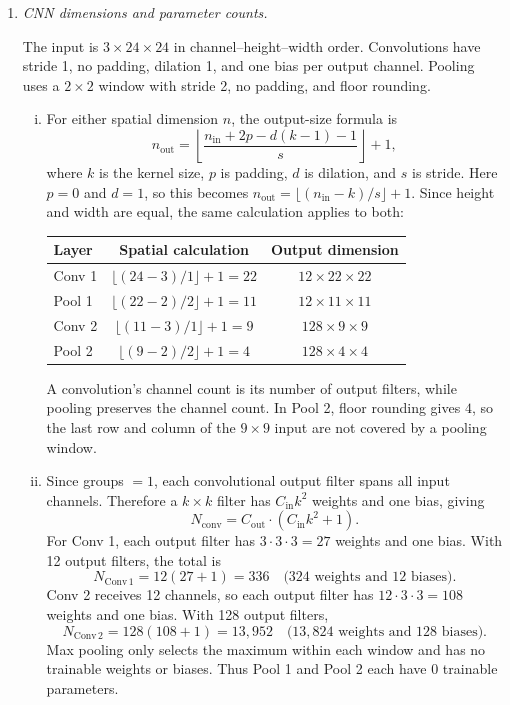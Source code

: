 \documentclass[12pt]{article}
\begin{document}
\begin{enumerate}
\begin{enumerate}[label=\textbf{\Alph*.}, leftmargin=*]
   \item \emph{CNN dimensions and parameter counts.}

   The input is $3\times24\times24$ in channel--height--width order.
   Convolutions have stride 1, no padding, dilation 1, and one bias per
   output channel. Pooling uses a $2\times2$ window with stride 2,
   no padding, and floor rounding.

   \begin{enumerate}[(i)]
    \item For either spatial dimension $n$, the output-size formula is
    \[
        n_{\mathrm{out}}
        =\left\lfloor\frac{n_{\mathrm{in}}+2p-d(k-1)-1}{s}\right\rfloor+1,
    \]
    where $k$ is the kernel size, $p$ is padding, $d$ is dilation,
    and $s$ is stride. Here $p=0$ and $d=1$, so this becomes
    $n_{\mathrm{out}}=\lfloor(n_{\mathrm{in}}-k)/s\rfloor+1$.
    Since height and width are equal, the same calculation applies to both:
    \begin{center}
    \begin{tabular}{l c c}
        \toprule
        Layer & Spatial calculation & Output dimension \\
        \midrule
        Conv 1 & $\lfloor(24-3)/1\rfloor+1=22$ & $12\times22\times22$ \\
        Pool 1 & $\lfloor(22-2)/2\rfloor+1=11$ & $12\times11\times11$ \\
        Conv 2 & $\lfloor(11-3)/1\rfloor+1=9$ & $128\times9\times9$ \\
        Pool 2 & $\lfloor(9-2)/2\rfloor+1=4$ & $128\times4\times4$ \\
        \bottomrule
    \end{tabular}
    \end{center}
    A convolution's channel count is its number of output filters, while
    pooling preserves the channel count. In Pool 2, floor rounding gives
    $4$, so the last row and column of the $9\times9$ input are not covered
    by a pooling window.

    \item Since groups $=1$, each convolutional output filter spans all input channels.
    Therefore a $k\times k$ filter has $C_{\mathrm{in}}k^2$ weights and
    one bias, giving
    \[
        N_{\mathrm{conv}}=C_{\mathrm{out}}\cdot(C_{\mathrm{in}}k^2+1).
    \]
    For Conv 1, each output filter has $3\cdot3\cdot3=27$ weights
    and one bias. With 12 output filters, the total is
    \[
        N_{\mathrm{Conv\,1}}=12(27+1)=\boxed{336}
        \quad\text{($324$ weights and $12$ biases).}
    \]
    Conv 2 receives 12 channels, so each output filter has
    $12\cdot3\cdot3=108$ weights and one bias. With 128 output filters,
    \[
        N_{\mathrm{Conv\,2}}=128(108+1)=\boxed{13{,}952}
        \quad\text{($13{,}824$ weights and $128$ biases).}
    \]
    Max pooling only selects the maximum within each window and has
    no trainable weights or biases. Thus Pool 1 and Pool 2 each have
    $\boxed{0}$ trainable parameters.


\end{enumerate}
\end{enumerate}
\end{enumerate}
\end{document}
